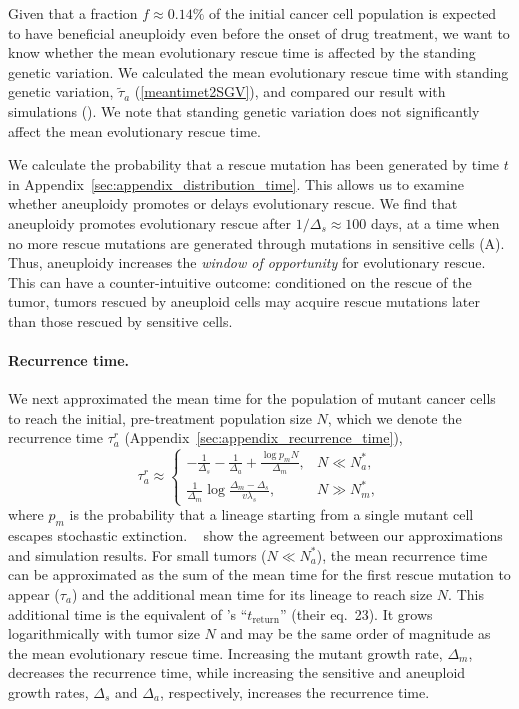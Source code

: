 \documentclass[12pt]{extarticle}
\begin{document}
Given that a fraction $f\approx 0.14\%$ of the initial cancer cell population is expected to have beneficial aneuploidy even before the onset of drug treatment, we want to know whether the mean evolutionary rescue time is affected by the standing genetic variation. We calculated the mean evolutionary rescue time with standing genetic variation, $\tilde{\tau}_a$ (\cref{meantimet2SGV}), and compared our result with simulations (). We note that standing genetic variation does not significantly affect the mean evolutionary rescue time. 

We calculate the probability that a rescue mutation has been generated by time $t$ in Appendix~\ref{sec:appendix_distribution_time}. This allows us to examine whether aneuploidy promotes or delays evolutionary rescue. 
We find that aneuploidy promotes evolutionary rescue after $1/\Delta_s\approx100$ days, at a time when no more rescue mutations are generated through mutations in sensitive cells (A). Thus, aneuploidy increases the \emph{window of opportunity} for evolutionary rescue. This can have a counter-intuitive outcome: conditioned on the rescue of the tumor, tumors rescued by aneuploid cells may acquire rescue mutations later than those rescued by sensitive cells. %

\paragraph{Recurrence time.}

We next approximated the mean time for the population of mutant cancer cells to reach the initial, pre-treatment population size $N$, which we denote the recurrence time $\tau_a^r$ (Appendix~\ref{sec:appendix_recurrence_time}),
\begin{equation} \label{eq:AsymptoticTimeRulesRecurrence}
\tau_a^r \approx \begin{cases}
   -\frac{1}{\Delta_s}-\frac{1}{\Delta_a}+\frac{\log p_mN}{\Delta_m} ,&
 N \ll N_a^* ,\\ 
  \frac{1}{\Delta_m}\log\frac{\Delta_m-\Delta_s}{v\lambda_s}  ,&
  N \gg N_m^* ,
  \end{cases}
\end{equation}
where $p_m$ is the probability that a lineage starting from a single mutant cell escapes stochastic extinction. %
  ~ show the agreement between our approximations and simulation results.
For small tumors ($N \ll N_a^*$), the mean recurrence time can be approximated as the sum of the mean time for the first rescue mutation to appear ($\tau_a$) and the additional mean time for its lineage to reach size $N$. 
This additional time is the equivalent of \citet{orr2014population}'s ``$t_\text{return}$'' (their eq.~23). 
It grows logarithmically with tumor size $N$ and may be the same order of magnitude as the mean evolutionary rescue time. 
Increasing the mutant growth rate, $\Delta_m$, decreases the recurrence time, while increasing the sensitive and aneuploid growth rates, $\Delta_s$ and $\Delta_a$, respectively, increases the recurrence time.
\end{document}
